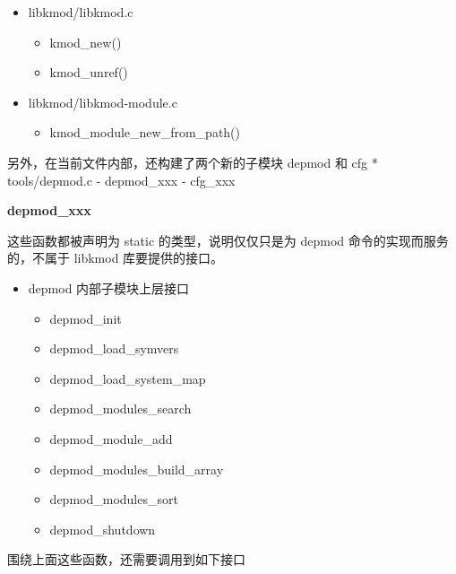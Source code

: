 \documentclass[11pt,a4paper]{article}
\begin{document}
\begin{itemize}
\item
  libkmod/libkmod.c
  \begin{itemize}
  \item
    kmod\_new()
  \item
    kmod\_unref()
  \end{itemize}
\item
  libkmod/libkmod-module.c
  \begin{itemize}
  \item
    kmod\_module\_new\_from\_path()
  \end{itemize}
\end{itemize}
另外，在当前文件内部，还构建了两个新的子模块 depmod 和 cfg *
tools/depmod.c - depmod\_xxx - cfg\_xxx

\textbf{depmod\_xxx}

这些函数都被声明为 static 的类型，说明仅仅只是为 depmod
命令的实现而服务的，不属于 libkmod 库要提供的接口。

\begin{itemize}
\item
  depmod 内部子模块上层接口
  \begin{itemize}
  \item
    depmod\_init
  \item
    depmod\_load\_symvers
  \item
    depmod\_load\_system\_map
  \item
    depmod\_modules\_search
  \item
    depmod\_module\_add
  \item
    depmod\_modules\_build\_array
  \item
    depmod\_modules\_sort
  \item
    depmod\_shutdown
  \end{itemize}
\end{itemize}
围绕上面这些函数，还需要调用到如下接口
\end{document}
